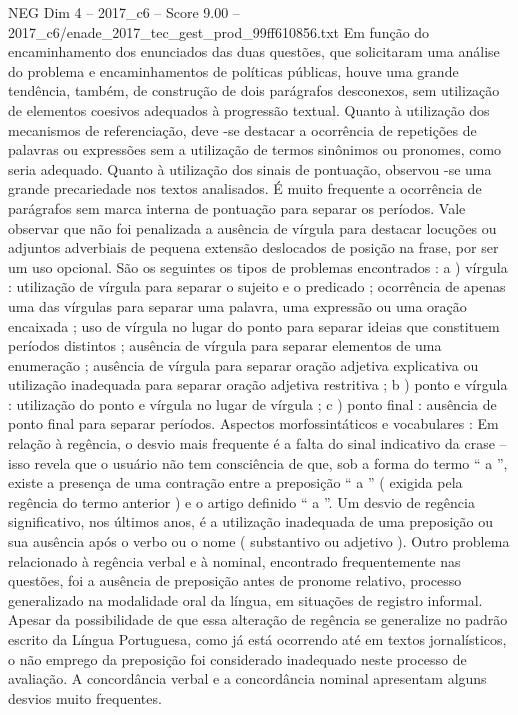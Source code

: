 \begin{textsample}{NEG Dim 4 – 2017\_c6 – Score 9.00 – 2017\_c6/enade\_2017\_tec\_gest\_prod\_99ff610856.txt}
Em função do encaminhamento dos enunciados das duas questões, que solicitaram uma análise do problema e encaminhamentos de políticas públicas, houve uma grande tendência, também, de construção de dois parágrafos desconexos, sem utilização de elementos coesivos adequados à progressão textual.
Quanto à utilização dos mecanismos de referenciação, deve -se destacar a ocorrência de repetições de palavras ou expressões sem a utilização de termos sinônimos ou pronomes, como seria adequado.
Quanto à utilização dos sinais de pontuação, observou -se uma grande precariedade nos textos analisados.
É muito frequente a ocorrência de parágrafos sem marca interna de pontuação para separar os períodos.
Vale observar que não foi penalizada a ausência de vírgula para destacar locuções ou adjuntos adverbiais de pequena extensão deslocados de posição na frase, por ser um uso opcional.
São os seguintes os tipos de problemas encontrados : a ) vírgula : utilização de vírgula para separar o sujeito e o predicado ; ocorrência de apenas uma das vírgulas para separar uma palavra, uma expressão ou uma oração encaixada ; uso de vírgula no lugar do ponto para separar ideias que constituem períodos distintos ; ausência de vírgula para separar elementos de uma enumeração ; ausência de vírgula para separar oração adjetiva explicativa ou utilização inadequada para separar oração adjetiva restritiva ; b ) ponto e vírgula : utilização do ponto e vírgula no lugar de vírgula ; c ) ponto final : ausência de ponto final para separar períodos.
Aspectos morfossintáticos e vocabulares : Em relação à regência, o desvio mais frequente é a falta do sinal indicativo da crase – isso revela que o usuário não tem consciência de que, sob a forma do termo “ a ”, existe a presença de uma contração entre a preposição “ a ” ( exigida pela regência do termo anterior ) e o artigo definido “ a ”.
Um desvio de regência significativo, nos últimos anos, é a utilização inadequada de uma preposição ou sua ausência após o verbo ou o nome ( substantivo ou adjetivo ).
Outro problema relacionado à regência verbal e à nominal, encontrado frequentemente nas questões, foi a ausência de preposição antes de pronome relativo, processo generalizado na modalidade oral da língua, em situações de registro informal.
Apesar da possibilidade de que essa alteração de regência se generalize no padrão escrito da Língua Portuguesa, como já está ocorrendo até em textos jornalísticos, o não emprego da preposição foi considerado inadequado neste processo de avaliação.
A concordância verbal e a concordância nominal apresentam alguns desvios muito frequentes.

\end{textsample}

